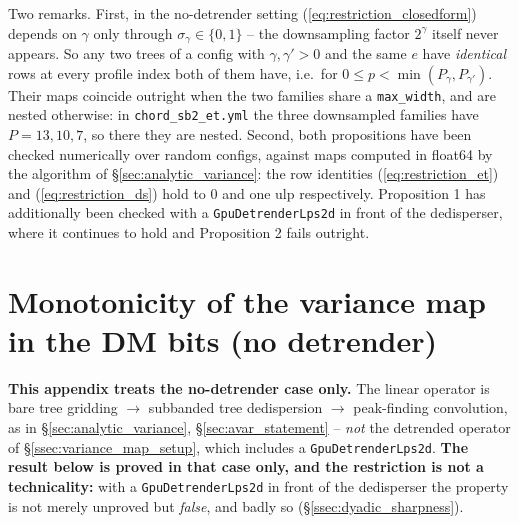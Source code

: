 \documentclass{article}
\numberwithin{equation}{section}   %
\begin{document}
\medskip
\par\noindent
Two remarks. First, in the no-detrender setting (\ref{eq:restriction_closedform}) depends on
$\gamma$ only through $\sigma_\gamma \in \{0,1\}$ -- the downsampling factor $2^\gamma$ itself
never appears. So any two trees of a config with $\gamma, \gamma' > 0$ and the same $e$ have
{\em identical} rows at every profile index both of them have, i.e.\ for
$0 \le p < \min(P_\gamma, P_{\gamma'})$. Their maps coincide outright when the two families
share a {\tt max\_width}, and are nested otherwise: in {\tt chord\_sb2\_et.yml} the three
downsampled families have $P = 13, 10, 7$, so there they are nested. Second, both propositions
have been checked numerically over random configs, against maps computed in float64 by the
algorithm of \S\ref{sec:analytic_variance}: the row identities (\ref{eq:restriction_et}) and
(\ref{eq:restriction_ds}) hold to $0$ and one ulp respectively. Proposition 1 has additionally been checked with a {\tt GpuDetrenderLps2d} in front of
the dedisperser, where it continues to hold and Proposition 2 fails outright.

\section{Monotonicity of the variance map in the DM bits (no detrender)}
\label{sec:dyadic_block}

{\bf This appendix treats the no-detrender case only.} The linear operator is bare tree
gridding $\to$ subbanded tree dedispersion $\to$ peak-finding convolution, as in
\S\ref{sec:analytic_variance}, \S\ref{sec:avar_statement} -- {\em not} the detrended
operator of \S\ref{ssec:variance_map_setup}, which includes a {\tt GpuDetrenderLps2d}.
{\bf The result below is proved in that case only, and the restriction is not a
technicality:} with a {\tt GpuDetrenderLps2d} in front of the dedisperser the property is not
merely unproved but {\em false}, and badly so (\S\ref{ssec:dyadic_sharpness}).
\end{document}
